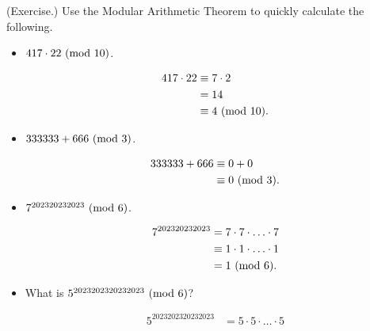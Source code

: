 \documentclass[letterpaper]{article}
\begin{document}
\begin{mdframed}
    (Exercise.) Use the Modular Arithmetic Theorem to quickly calculate the following. 
    \begin{itemize}
        \item $417 \cdot 22 \ (\mathrm{mod}\ 10)$.
        \begin{mdframed}
            \begin{equation*}
                \begin{aligned}
                    417 \cdot 22 &\equiv 7 \cdot 2  \\ 
                        &= 14 \\ 
                        &\equiv 4 \ (\mathrm{mod}\ 10).
                \end{aligned}
            \end{equation*}
        \end{mdframed}
        \item $333333 + 666 \ (\mathrm{mod}\ 3)$.
        \begin{mdframed}
            \begin{equation*}
                \begin{aligned}
                    333333 + 666 &\equiv 0 + 0 \\ 
                        &\equiv 0 \ (\mathrm{mod}\ 3).
                \end{aligned}
            \end{equation*}
        \end{mdframed}
        \item $7^{202320232023} \ (\mathrm{mod}\ 6)$. 
        \begin{mdframed}
            \begin{equation*}
                \begin{aligned}
                    7^{202320232023} &= 7 \cdot 7 \cdot \hdots \cdot 7 \\ 
                        &\equiv 1 \cdot 1 \cdot \hdots \cdot 1 \\ 
                        &= 1 \ (\mathrm{mod}\ 6).
                \end{aligned}
            \end{equation*}
        \end{mdframed}
        \item What is $5^{2023202320232023} \ (\mathrm{mod}\ 6)$?
        \begin{mdframed}
            \begin{equation*}
                \begin{aligned}
                    5^{2023202320232023} &= 5 \cdot 5 \cdot \hdots \cdot 5 \\ 

\end{aligned}
\end{equation*}
\end{mdframed}
\end{itemize}
\end{mdframed}
\end{document}
